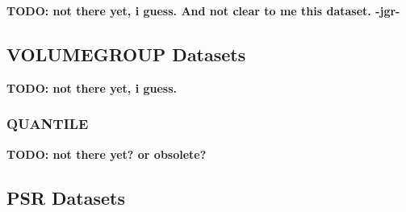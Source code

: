 \documentclass[a4paper,11pt,pdftex,twoside]{scrartcl}
\renewcommand{\bf}{\normalfont \bfseries}
\begin{document}
{{{{\bf TODO: not there yet, i guess. And not clear to me this dataset. -jgr-}

%

\subsection{VOLUMEGROUP Datasets}

{\bf TODO: not there yet, i guess. }

\subsubsection{QUANTILE}
\label{subsec_quantile}

{\bf TODO: not there yet? or obsolete?}

%
%

\subsection{PSR Datasets}

}}}
\end{document}
